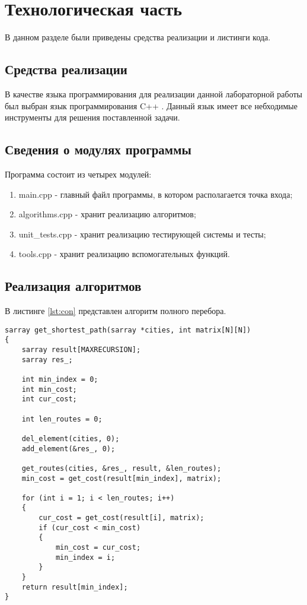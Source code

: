 \chapter{Технологическая часть}

В данном разделе были приведены средства реализации и листинги кода.

\section{Средства реализации}

В качестве языка программирования для реализации данной лабораторной работы был выбран язык программирования C++ \cite{Cpp}.
Данный язык имеет все небходимые инструменты для решения поставленной задачи.

\section{Сведения о модулях программы}
Программа состоит из четырех модулей:
\begin{enumerate}
        \item main.cpp - главный файл программы, в котором располагается точка входа;
	\item algorithms.cpp - хранит реализацию алгоритмов;
	\item unit\_tests.cpp - хранит реализацию тестирующей системы и тесты;
	\item tools.cpp - хранит реализацию вспомогательных функций.
\end{enumerate}

\section{Реализация алгоритмов}

В листинге \ref{lst:con} представлен алгоритм полного перебора.

\captionsetup{singlelinecheck = false, justification=raggedright}
\begin{lstlisting}[label=lst:con,caption=Реализация алгоритма полного перебора]
sarray get_shortest_path(sarray *cities, int matrix[N][N])
{
    sarray result[MAXRECURSION];
    sarray res_;

    int min_index = 0;
    int min_cost;
    int cur_cost;
    
    int len_routes = 0;
	
    del_element(cities, 0);
    add_element(&res_, 0);

    get_routes(cities, &res_, result, &len_routes);
    min_cost = get_cost(result[min_index], matrix);

    for (int i = 1; i < len_routes; i++)
    {
        cur_cost = get_cost(result[i], matrix);
        if (cur_cost < min_cost)
        {
            min_cost = cur_cost;
            min_index = i;
        }
    }
    return result[min_index];
}
\end{lstlisting}

